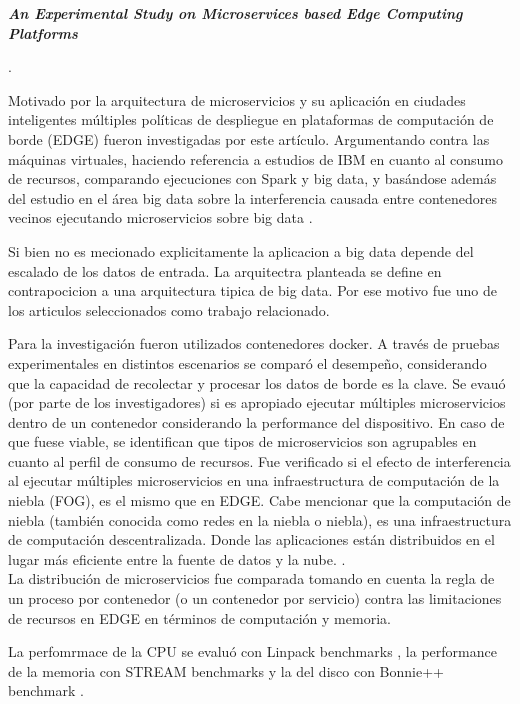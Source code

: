 \textbf{\emph{An Experimental Study on Microservices based Edge Computing Platforms}}

 \cite{qu_experimental_2020}.

Motivado por la arquitectura de microservicios y su aplicación en ciudades inteligentes
múltiples políticas de despliegue en plataformas de computación de borde (EDGE) fueron investigadas por este artículo.
Argumentando contra las máquinas virtuales, haciendo referencia a estudios de IBM en cuanto al consumo de recursos, 
comparando ejecuciones con Spark \cite{ApacheSpark} y big data, y basándose además del estudio en el área big data sobre la interferencia causada entre contenedores vecinos ejecutando microservicios sobre big data \cite{BigDataWikipedia}.

Si bien no es mecionado explicitamente la aplicacion a big data depende del escalado de los datos de entrada. La arquitectra planteada se define en contrapocicion a una arquitectura tipica de big data. Por ese motivo fue uno de los articulos seleccionados como trabajo relacionado. 

Para la investigación fueron utilizados contenedores docker. A través de pruebas experimentales en distintos escenarios se comparó el desempeño, considerando que la capacidad de recolectar y procesar los datos de borde es la clave.
Se evauó (por parte de los investigadores) si es apropiado ejecutar múltiples microservicios dentro de un contenedor considerando la performance del dispositivo.
En caso de que fuese viable, se identifican que tipos de microservicios son agrupables en cuanto al perfil de consumo de recursos.
Fue verificado si el efecto de interferencia al ejecutar múltiples microservicios en una infraestructura de computación de la niebla (FOG), es el mismo que en EDGE. Cabe mencionar que la computación de niebla (también conocida como redes en la niebla o niebla),
es una infraestructura de computación descentralizada. Donde las aplicaciones están distribuidos en el lugar más eficiente entre la fuente de datos y la nube.
\cite{webfog}.
\\
La distribución de microservicios fue comparada tomando en cuenta la regla de un proceso por contenedor (o un contenedor por servicio) 
\cite{cont_por_serv} 
contra las limitaciones de recursos en EDGE en términos de computación y memoria. 

La perfomrmace de la CPU se evaluó con Linpack benchmarks 
\cite{LINPACKBenchmarksWikipedia}, la performance de la memoria con STREAM benchmarks 
\cite{STREAMBenchmarkAMD} 
y la del disco con Bonnie++ benchmark \cite{BonnieWikipedia}.

